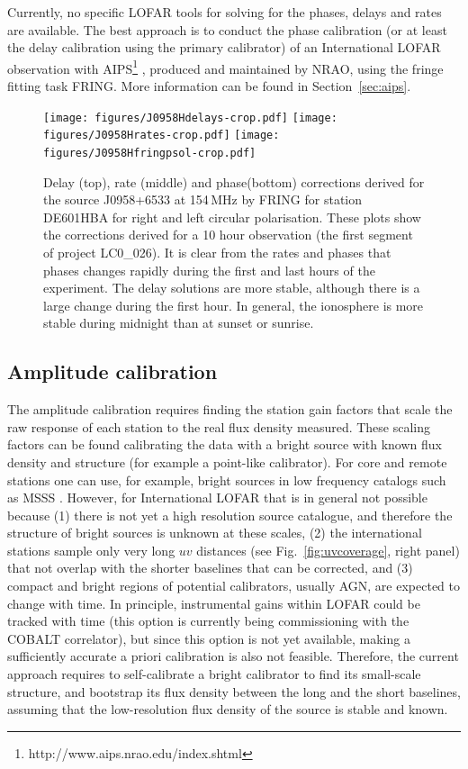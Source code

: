 \documentclass[graybox]{svmult}
\begin{document}
Currently, no specific LOFAR tools for solving for the phases, delays and rates
are available. The best approach is to conduct the phase calibration (or at
least the delay calibration using the primary calibrator) of an International
LOFAR observation with AIPS\footnote{http://www.aips.nrao.edu/index.shtml}
\citep{greisen03a}, produced and maintained by NRAO, using the fringe fitting
task FRING. More information can be found in Section~\ref{sec:aips}.

\begin{figure}[htbp]
\begin{center}
\texttt{[image: figures/J0958Hdelays-crop.pdf]}
\texttt{[image: figures/J0958Hrates-crop.pdf]}
\texttt{[image: figures/J0958Hfringpsol-crop.pdf]}
\caption{
Delay (top), rate (middle) and phase(bottom) corrections derived for the source
J0958+6533 at 154\,MHz by FRING for station DE601HBA for right and left
circular polarisation. These plots show the corrections derived for a 10 hour
observation (the first segment of project LC0\_026). It is clear from the rates
and phases that phases changes rapidly during the first and last hours of the
experiment. The delay solutions are more stable, although there is a large
change during the first hour. In general, the ionosphere is more stable during
midnight than at sunset or sunrise.  }

\end{center}
\end{figure}


\subsection{Amplitude calibration}

The amplitude calibration requires finding the station gain factors that scale
the raw response of each station to the real flux density measured.  These
scaling factors can be found calibrating the data with a bright source with
known flux density and structure (for example a point-like calibrator).  For
core and remote stations one can use, for example, bright sources in low
frequency catalogs such as MSSS \citep{heald14}. However, for International
LOFAR that is in general not possible because (1) there is not yet a
high resolution source catalogue, and therefore the structure of bright sources
is unknown at these scales, (2) the international stations sample only very long
$uv$ distances (see Fig.~\ref{fig:uvcoverage}, right panel) that not overlap
with the shorter baselines that can be corrected, and (3) compact and bright
regions of potential calibrators, usually AGN, are expected to change with
time. In principle, instrumental gains within LOFAR could be tracked with time
(this option is currently being commissioning with the COBALT correlator), but
since this option is not yet available, making a sufficiently  accurate a
priori calibration is also not feasible. Therefore, the current approach
requires to self-calibrate a bright calibrator to find its small-scale
structure, and bootstrap its flux density between the long and the short
baselines, assuming that the low-resolution flux density of the source is
stable and known. 
\end{document}
